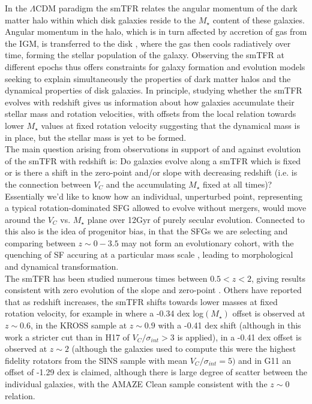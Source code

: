 \documentclass[fleqn,usenatbib]{mn2e}
\begin{document}
In the $\Lambda$CDM paradigm the smTFR relates the angular momentum of the dark matter halo within which disk galaxies reside to the $M_{\star}$ content of these galaxies.
Angular momentum in the halo, which is in turn affected by accretion of gas from the IGM, is transferred to the disk \citep{Fall1983}, where the gas then cools radiatively over time, forming the stellar population of the galaxy.
Observing the smTFR at different epochs thus offers constraints for galaxy formation and evolution models seeking to explain simultaneously the properties of dark matter halos and the dynamical properties of disk galaxies.
In principle, studying whether the smTFR evolves with redshift gives us information about how galaxies accumulate their stellar mass and rotation velocities, with offsets from the local relation towards lower $M_{\star}$ values at fixed rotation velocity suggesting that the dynamical mass is in place, but the stellar mass is yet to be formed. \\

The main question arising from observations in support of and against evolution of the smTFR with redshift is: Do galaxies evolve along a smTFR which is fixed or is there a shift in the zero-point and/or slope with decreasing redshift (i.e. is the connection between $V_{C}$ and the accumulating $M_{\star}$ fixed at all times)?
Essentially we'd like to know how an individual, unperturbed point, representing a typical rotation-dominated SFG allowed to evolve without mergers, would move around the $V_{C}$ vs. $M_{\star}$ plane over 12Gyr of purely secular evolution.
Connected to this also is the idea of progenitor bias, in that the SFGs we are selecting and comparing between $z\sim0-3.5$ may not form an evolutionary cohort, with the quenching of SF accuring at a particular mass scale \citep[e.g.][]{Keres2005,Dekel2006,Peng2010}, leading to morphological and dynamical transformation. \\

The smTFR has been studied numerous times between $0.5 < z < 2$, giving results consistent with zero evolution of the slope and zero-point \citep[e.g.][]{Flores2006,Miller2011,Kassin2012,Miller2012,Vergani2012,Miller2014,Contini2015a,Molina2016,Pelliccia2016,DiTeodoro2016,Harrison2017}.
Others have reported that as redshift increases, the smTFR shifts towards lower masses at fixed rotation velocity, for example in \cite{Puech2008,Puech2010} where a -0.34 dex log$(M_{\star})$ offset is observed at $z\sim0.6$, in the \cite{Tiley2016a} KROSS sample at $z\sim0.9$ with a -0.41 dex shift (although in this work a stricter cut than in H17 of $V_{C}/\sigma_{int} > 3$ is applied), in \cite{Cresci2009} a -0.41 dex offset is observed at $z\sim2$ (although the galaxies used to compute this were the highest fidelity rotators from the SINS sample with mean $V_{C}/\sigma_{int} = 5)$ and in G11 an offset of -1.29 dex is claimed, although there is large degree of scatter between the individual galaxies, with the AMAZE Clean sample consistent with the $z\sim0$ relation. \\
\end{document}
